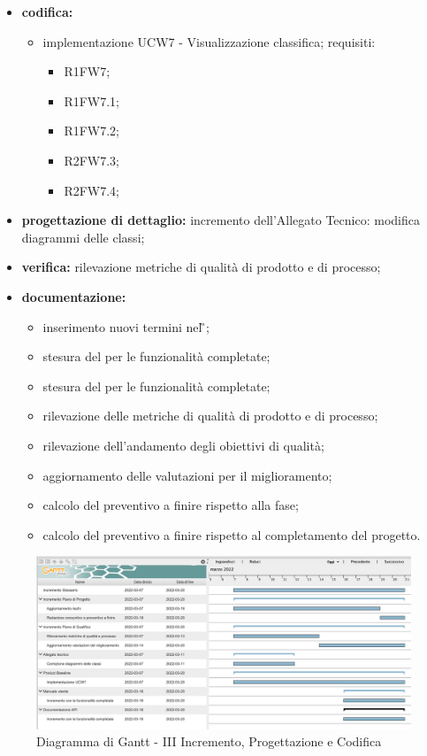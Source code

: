 \begin{itemize}
	\item \textbf{codifica:} 
			\begin{itemize}
				\item implementazione UCW7 - Visualizzazione classifica; requisiti:
					\begin{itemize}
						\item R1FW7;
						\item R1FW7.1;
						\item R1FW7.2;
						\item R2FW7.3;
						\item R2FW7.4;
					\end{itemize}
			\end{itemize}
	\item \textbf{progettazione di dettaglio:} incremento dell’Allegato Tecnico: modifica diagrammi delle classi;
 	\item \textbf{verifica:} rilevazione metriche di qualità di prodotto e di processo;
	\item \textbf{documentazione:} 
	 \begin{itemize}
		\item inserimento nuovi termini nel \G{};
		\item stesura del \MU{} per le funzionalità completate;
		\item stesura del \MS{} per le funzionalità completate;
     	\item rilevazione delle metriche di qualità di prodotto e di processo;
     	\item rilevazione dell’andamento degli obiettivi di qualità;
		\item aggiornamento delle valutazioni per il miglioramento; 
		\item calcolo del preventivo a finire rispetto alla fase;
		\item calcolo del preventivo a finire rispetto al completamento del progetto.
	 \end{itemize}
\end{itemize}
\begin{figure}[H]
	\centering
	\includegraphics[scale=0.35]{Sezioni/gantt/III_incremento.png}
	\caption{Diagramma di Gantt - III Incremento, Progettazione e Codifica}
\end{figure}

